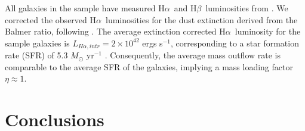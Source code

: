 \documentclass[manuscript]{emulateapj}
\newcommand{\ha}{H$\alpha$}
\newcommand{\hb}{H$\beta$}
\begin{document}
All galaxies in the sample have measured \ha\ and \hb\ luminosities
from \citet{atek2014,cowie2011,scarlata2009}. We corrected the
observed \ha\ luminosities for the dust extinction derived from the
Balmer ratio, following
\citet[e.g.][]{dominguez2013}. The average extinction corrected \ha\
luminosity for the sample galaxies is $L_{H\alpha , intr} =2\times
10^{42}$ ergs s$^{-1}$, corresponding to a star formation rate (SFR)
of 5.3 $M_{\odot}$ yr$^{-1}$ \citep[][]{kennicutt2012}.  Consequently,
the average mass outflow rate is comparable to the average SFR of the
galaxies, implying a mass loading factor $\eta \approx 1$. 






\section{Conclusions}

 

\end{document}
